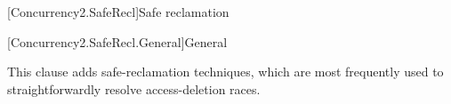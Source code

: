 
[Concurrency2.SafeRecl]{Safe reclamation}

[Concurrency2.SafeRecl.General]{General}

This clause adds safe-reclamation techniques, which are most frequently
used to straightforwardly resolve access-deletion races.
